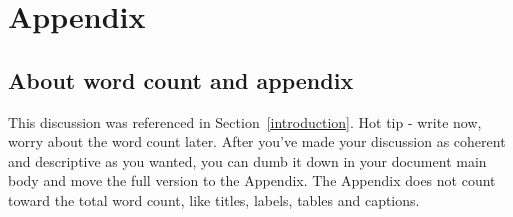 \section{Appendix}\label{appendix}

\subsection{About word count and appendix}\label{About word count and appendix}
This discussion was referenced in Section~\ref{introduction}.
Hot tip - write now, worry about the word count later. After you've made your discussion as coherent and descriptive as you wanted, you can dumb it down in your document main body and move the full version to the Appendix. The Appendix does not count toward the total word count, like titles, labels, tables and captions.